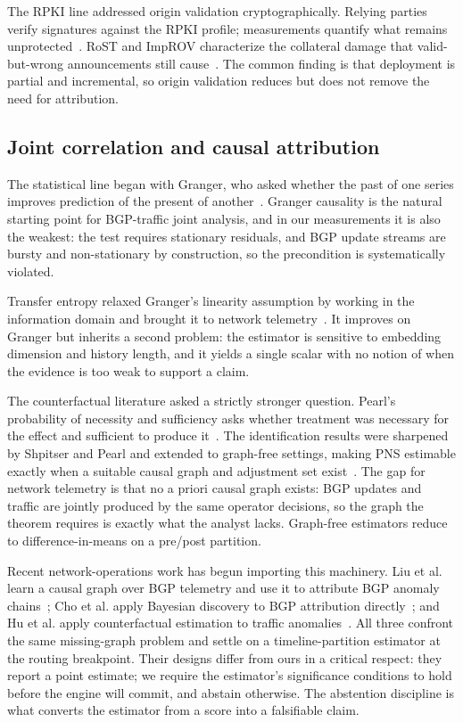 The RPKI line addressed origin validation cryptographically. Relying parties verify signatures against the RPKI profile; measurements quantify what remains unprotected~\cite{cooper-2013-rpki,testart-2025-rpki,ahmad-2024-rpki-fail}. RoST and ImpROV characterize the collateral damage that valid-but-wrong announcements still cause~\cite{rost2025,improv2025}. The common finding is that deployment is partial and incremental, so origin validation reduces but does not remove the need for attribution.

\subsection{Joint correlation and causal attribution}

The statistical line began with Granger, who asked whether the past of one series improves prediction of the present of another~\cite{granger-1969-investigating}. Granger causality is the natural starting point for BGP-traffic joint analysis, and in our measurements it is also the weakest: the test requires stationary residuals, and BGP update streams are bursty and non-stationary by construction, so the precondition is systematically violated.

Transfer entropy relaxed Granger's linearity assumption by working in the information domain and brought it to network telemetry~\cite{schreiber-2000-te,barnett-2009-granger-network}. It improves on Granger but inherits a second problem: the estimator is sensitive to embedding dimension and history length, and it yields a single scalar with no notion of when the evidence is too weak to support a claim.

The counterfactual literature asked a strictly stronger question. Pearl's probability of necessity and sufficiency asks whether treatment was necessary for the effect and sufficient to produce it~\cite{pearl-causality-2009,pearl1999}. The identification results were sharpened by Shpitser and Pearl and extended to graph-free settings, making PNS estimable exactly when a suitable causal graph and adjustment set exist~\cite{shpitser-2008-pns,pearl-2014-pns-3}. The gap for network telemetry is that no a priori causal graph exists: BGP updates and traffic are jointly produced by the same operator decisions, so the graph the theorem requires is exactly what the analyst lacks. Graph-free estimators reduce to difference-in-means on a pre/post partition.

Recent network-operations work has begun importing this machinery. Liu et al. learn a causal graph over BGP telemetry and use it to attribute BGP anomaly chains~\cite{liu-2024-bgp-cause}; Cho et al. apply Bayesian discovery to BGP attribution directly~\cite{cho-2025-causal-bgp}; and Hu et al. apply counterfactual estimation to traffic anomalies~\cite{hu-2025-traffic-causal}. All three confront the same missing-graph problem and settle on a timeline-partition estimator at the routing breakpoint. Their designs differ from ours in a critical respect: they report a point estimate; we require the estimator's significance conditions to hold before the engine will commit, and abstain otherwise. The abstention discipline is what converts the estimator from a score into a falsifiable claim.

